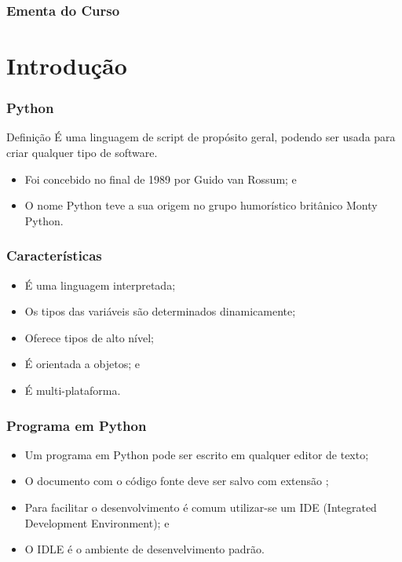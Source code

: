 \documentclass[aspectratio=169]{beamer} %
\begin{document}
\begin{frame}
	\frametitle{Ementa do Curso}
  	\tableofcontents
\end{frame}


\section{Introdução}

\begin{frame}
	\frametitle{Python}

	\begin{block}{Definição}
		É uma linguagem de script de propósito geral, podendo ser usada para criar
		qualquer tipo de software.
	\end{block}\vfill
	
	\begin{itemize}
		\item Foi concebido no final de 1989 por Guido van Rossum; e
		\item O nome Python teve a sua origem no grupo humorístico britânico
		Monty Python.
	\end{itemize}
\end{frame}

\begin{frame}
\frametitle{Características}

\begin{itemize}
	\item É uma linguagem interpretada;
	\item Os tipos das variáveis são determinados dinamicamente;
	\item Oferece tipos de alto nível;
	\item É orientada a objetos; e
	\item É multi-plataforma.
\end{itemize}
\end{frame}

\begin{frame}
\frametitle{Programa em Python}

\begin{itemize}
	\item Um programa em Python pode ser escrito em qualquer editor de texto;
	\item O documento com o código fonte deve ser salvo com extensão ;
	\item Para facilitar o desenvolvimento é comum utilizar-se um IDE
	(Integrated Development Environment); e
	\item O IDLE é o ambiente de desenvelvimento padrão.
\end{itemize}
\end{frame}
\end{document}
